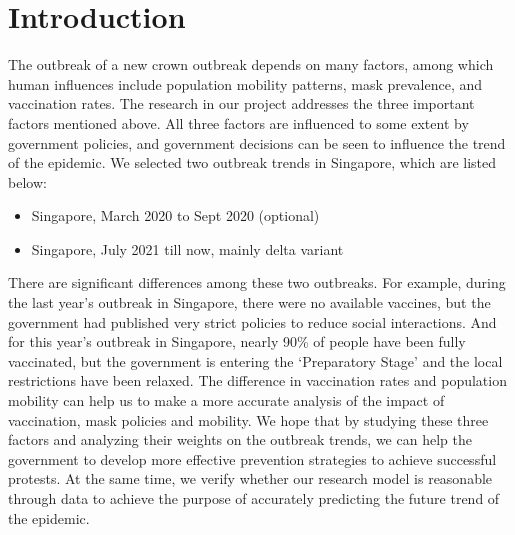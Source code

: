 \section{Introduction}
The outbreak of a new crown outbreak depends on many factors, among which human influences include population mobility patterns, mask prevalence, and vaccination rates. The research in our project addresses the three important factors mentioned above. All three factors are influenced to some extent by government policies, and government decisions can be seen to influence the trend of the epidemic. We selected two outbreak trends in Singapore, which are listed below:
\begin{itemize}
	\item Singapore, March 2020 to Sept 2020 (optional)
	\item Singapore, July 2021 till now, mainly delta variant
\end{itemize}

There are significant differences among these two outbreaks. For example, during the last year's outbreak in Singapore, there were no available vaccines, but the government had published very strict policies to reduce social interactions. And for this year's outbreak in Singapore, nearly 90\% of people have been fully vaccinated, but the government is entering the `Preparatory Stage' and the local restrictions have been relaxed. The difference in vaccination rates and population mobility can help us to make a more accurate analysis of the impact of vaccination, mask policies and mobility. We hope that by studying these three factors and analyzing their weights on the outbreak trends, we can help the government to develop more effective prevention strategies to achieve successful protests. At the same time, we verify whether our research model is reasonable through data to achieve the purpose of accurately predicting the future trend of the epidemic.